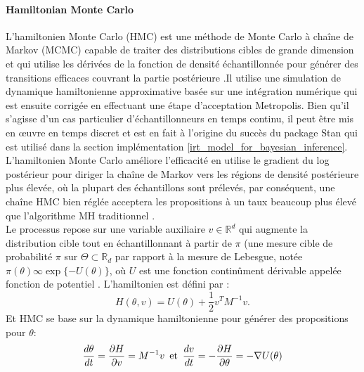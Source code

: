 \paragraph{Hamiltonian Monte Carlo}
L'hamiltonien Monte Carlo (HMC) est une méthode de Monte Carlo à chaîne de Markov (MCMC) capable de traiter des distributions cibles de grande dimension et qui utilise les dérivées de la fonction de densité échantillonnée pour générer des transitions efficaces couvrant la partie postérieure \cite{neal2011mcmc} \cite{betancourt2015hamiltonian}.Il utilise une simulation de dynamique hamiltonienne approximative basée sur une intégration numérique qui est ensuite corrigée en effectuant une étape d'acceptation Metropolis. Bien qu'il s'agisse d'un cas particulier d'échantillonneurs en temps continu, il peut être mis en œuvre en temps discret et est en fait à l'origine du succès du package Stan qui est utilisé dans la section implémentation \ref{irt_model_for_bayesian_inference}. L'hamiltonien Monte Carlo améliore l'efficacité en utilise le gradient du log postérieur pour diriger la chaîne de Markov vers les régions de densité postérieure plus élevée, où la plupart des échantillons sont prélevés, par conséquent, une chaîne HMC bien réglée acceptera les propositions à un taux beaucoup plus élevé que l'algorithme MH traditionnel \cite{gelman1997weak}. \\
Le processus repose sur une variable auxiliaire \(\displaystyle v \in \mathbb{R}^{d} \) qui augmente la distribution cible tout en échantillonnant à partir de \(\displaystyle \pi \) (une mesure cible de probabilité \(\displaystyle \pi \) sur \(\displaystyle \varTheta \subset \mathbb{R}_{d}\) par rapport à la mesure de Lebesgue, notée \(\displaystyle \pi(\theta) \infty \exp\{-U(\theta)\} \), où \(\displaystyle U \) est une fonction continûment dérivable appelée fonction de potentiel \cite{wu2018faster}. 
L’hamiltonien est défini par :
\begin{equation}
	H(\theta,v) = U(\theta) + \frac{1}{2}v^{T}M^{-1}v.
\end{equation}
\noindent Et HMC se base sur la dynamique hamiltonienne pour générer des propositions pour \(\displaystyle \theta \):
\begin{equation}
	\frac{d\theta}{dt} = \frac{\partial H}{\partial v} = M^{-1}v \hspace{0.5em} \text{et} \hspace{0.5em} \frac{dv}{dt} = - \frac{\partial H}{\partial \theta} = - \nabla U(\theta)
\end{equation}


